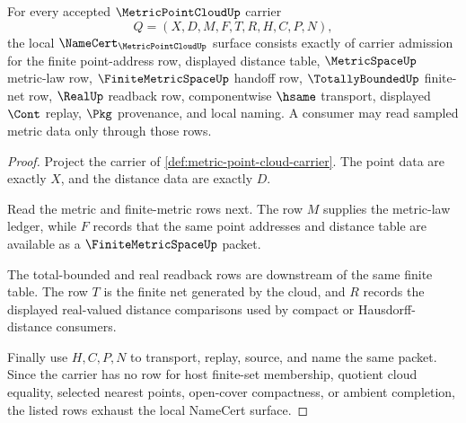 \begin{theorem}
\label{thm:metric-point-cloud-namecert-obligations}
For every accepted $\MetricPointCloudUp$ carrier
$$
Q=(X,D,M,F,T,R,H,C,P,N),
$$
the local $\NameCert_{\MetricPointCloudUp}$ surface consists exactly of carrier admission for the finite point-address row, displayed distance table, $\MetricSpaceUp$ metric-law row, $\FiniteMetricSpaceUp$ handoff row, $\TotallyBoundedUp$ finite-net row, $\RealUp$ readback row, componentwise $\hsame$ transport, displayed $\Cont$ replay, $\Pkg$ provenance, and local naming. A consumer may read sampled metric data only through those rows.
\end{theorem}
\begin{proof}
Project the carrier of \autoref{def:metric-point-cloud-carrier}. The point data are exactly $X$, and the distance data are exactly $D$.

Read the metric and finite-metric rows next. The row $M$ supplies the metric-law ledger, while $F$ records that the same point addresses and distance table are available as a $\FiniteMetricSpaceUp$ packet.

The total-bounded and real readback rows are downstream of the same finite table. The row $T$ is the finite net generated by the cloud, and $R$ records the displayed real-valued distance comparisons used by compact or Hausdorff-distance consumers.

Finally use $H,C,P,N$ to transport, replay, source, and name the same packet. Since the carrier has no row for host finite-set membership, quotient cloud equality, selected nearest points, open-cover compactness, or ambient completion, the listed rows exhaust the local NameCert surface.
\end{proof}

